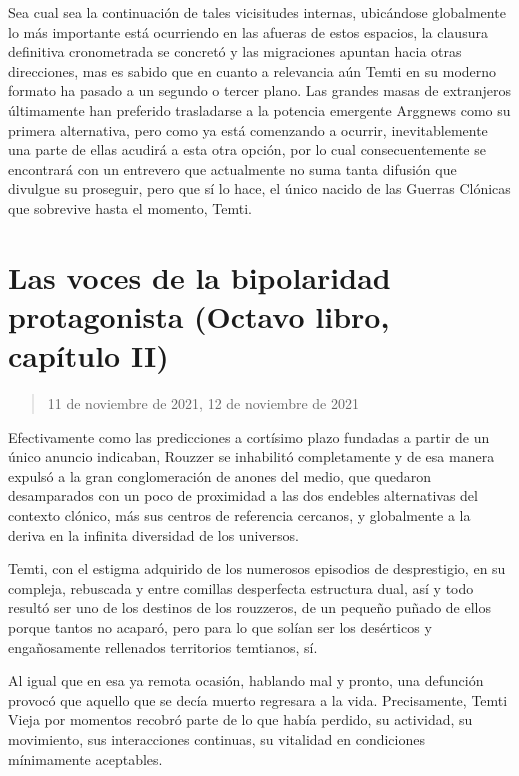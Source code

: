 \documentclass[
]{book}
\begin{document}
Sea cual sea la continuación de tales vicisitudes internas, ubicándose globalmente lo más importante está ocurriendo en las afueras de estos espacios, la clausura definitiva cronometrada se concretó y las migraciones apuntan hacia otras direcciones, mas es sabido que en cuanto a relevancia aún Temti en su moderno formato ha pasado a un segundo o tercer plano. Las grandes masas de extranjeros últimamente han preferido trasladarse a la potencia emergente Arggnews como su primera alternativa, pero como ya está comenzando a ocurrir, inevitablemente una parte de ellas acudirá a esta otra opción, por lo cual consecuentemente se encontrará con un entrevero que actualmente no suma tanta difusión que divulgue su proseguir, pero que sí lo hace, el único nacido de las Guerras Clónicas que sobrevive hasta el momento, Temti.

\hypertarget{las-voces-de-la-bipolaridad-protagonista-octavo-libro-capuxedtulo-ii}{%
\section{Las voces de la bipolaridad protagonista (Octavo libro, capítulo II)}\label{las-voces-de-la-bipolaridad-protagonista-octavo-libro-capuxedtulo-ii}}

\begin{quote}
11 de noviembre de 2021, 12 de noviembre de 2021
\end{quote}

Efectivamente como las predicciones a cortísimo plazo fundadas a partir de un único anuncio indicaban, Rouzzer se inhabilitó completamente y de esa manera expulsó a la gran conglomeración de anones del medio, que quedaron desamparados con un poco de proximidad a las dos endebles alternativas del contexto clónico, más sus centros de referencia cercanos, y globalmente a la deriva en la infinita diversidad de los universos.

Temti, con el estigma adquirido de los numerosos episodios de desprestigio, en su compleja, rebuscada y entre comillas desperfecta estructura dual, así y todo resultó ser uno de los destinos de los rouzzeros, de un pequeño puñado de ellos porque tantos no acaparó, pero para lo que solían ser los desérticos y engañosamente rellenados territorios temtianos, sí.

Al igual que en esa ya remota ocasión, hablando mal y pronto, una defunción provocó que aquello que se decía muerto regresara a la vida. Precisamente, Temti Vieja por momentos recobró parte de lo que había perdido, su actividad, su movimiento, sus interacciones continuas, su vitalidad en condiciones mínimamente aceptables.
\end{document}
